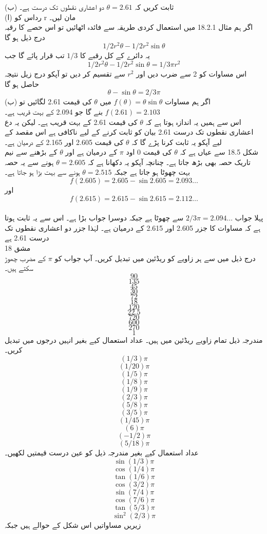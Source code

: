 (ب) ثابت کریں کہ 
\(\theta=2.61\)
دو اعشاری نقطوں تک درست ہے۔ \\
(ا) رداس کو 
r
مان لیں۔ 
\\اگر ہم مثال 18.2.1 میں استعمال کردی طریقہ سے فائدہ اٹھائیں تو اس حصے کا رقبہ درج ذیل ہو گا 
\[{1/2}r^2\theta-{1/2}r^2\sin\theta\]
یہ دائرے کے کل رقبے کا 
\(1/3\)
تب قرار پائے گا جب 
\[1/2r^2\theta-1/2r^2\sin\theta=1/3\pi r^2\]
اس مساوات کو 2 سے ضرب دیں اور 
\(r^{2}\)
سے تقسیم کر دیں تو آپکو درج زیل نتیجہ حاصل ہو گا\\
\[\theta-\sin\theta=2/3\pi\]
(ب) اگر ہم مساوات 
\(f(\theta)=\theta\sin{\theta}\)
میں 
\(\theta\)
کی قیمت 2.61 لگائیں تو 
\(f(2.61)=2.103\)
بنے گا جو 
2.094
کے بہت قریب ہے۔ \\
اس سے ہمیں یہ اندازہ ہوتا ہے کہ 
\(\theta\)
کی قیمت 2.61 کے بہت قریب ہے۔ لیکن یہ دع اعشاری نقطوں تک درست 2.61 بیان کو ثابت کرنے کے لیے ناکافی ہے 
اس مقصد کے لیے آپکو یہ ثابت کرنا پڑے گا کہ 
\(\theta\)
کی قیمت 2.605 اور 2.165 کے درمیان ہے۔ \\
شکل 18.5 سے عیاں ہے کہ 
\(\theta\)
کی قیمت 
0
اود 
\(\pi\)
کے درمیان ہے اور 
\(\theta\)
کے بڑھنے سے نیم تاریک حصہ بھی بڑھ جاتا ہے۔ چنانچہ آپکو یہ دکھانا ہے کہ 
\(\theta=2.605\)
ہونے سے یہ حصہ بہت چھوٹا ہو جاتا ہے جبکہ 
\(\theta=2.515\)
ہونے سے بہت بڑا ہو جاتا ہے۔ \\
\[f(2.605)=2.605-\sin2.605=2.093\dotsc\]
اور 
\[f(2.615)=2.615-\sin2.615=2.112\dotsc\]\\
پہلا جواب 
\(2/3\pi=2.094\dotsc\)
سے چھوٹا ہے جبکہ دوسرا جواب بڑا ہے۔ اس سے یہ ثابت ہوتا ہے کہ مساوات کا جزر  2.605 اور 2.615 کے درمیان ہے۔ لہٰذا جزر دو اعشاری نقطوں تک درست 2.61 ہے\\
مشق 18\\
درج ذیل میں سے ہر زاویے کو ریڈئین میں تبدیل کریں۔ آپ جواب کو 
\(\pi\)
کے مضرب چھوڑ سکتے ہیں۔ \\
\[90\]
\[135\]
\[45\]
\[30\]
\[72\]
\[18\]
\[120\]
\[22.5\]
\[720\]
\[600\]
\[270\]
\[1\]
مندرجہ ذیل تمام زاویے ریڈئین میں ہیں۔ عداد استعمال کیے بغیر انہیں درجوں میں تبدیل کریں۔ \\
\[(1/3)\pi\]
\[(1/20)\pi\]
\[(1/5)\pi\]
\[(1/8)\pi\]
\[(1/9)\pi\]
\[(2/3)\pi\]
\[(5/8)\pi\]
\[(3/5)\pi\]
\[(1/45)\pi\]
\[(6)\pi\]
\[(-1/2)\pi\]
\[(5/18)\pi\]
عداد استعمال کیے بغیر مندرجہ ذیل کو عین درست قیمتیں لکھیں۔ \\
\[\sin(1/3)\pi\]
\[\cos(1/4)\pi\]
\[\tan(1/6)\pi\]
\[\cos(3/2)\pi\]
\[\sin(7/4)\pi\]
\[\cos(7/6)\pi\]
\[\tan(5/3)\pi\]
\[\sin^2(2/3)\pi\]
زیریں مساواتیں اس شکل کے حوالے ہیں جبکہ 
